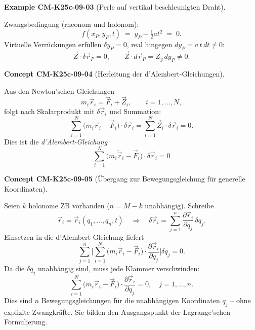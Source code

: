 \documentclass[10pt, letterpaper]{article}
\newcommand{\CustomHeading}[3]{%
  \par\medskip\noindent%
  \textbf{#1 #2} \textnormal{(#3)}.\enskip%
}
\newenvironment{EXA}[2]{\CustomHeading{Example}{#1}{#2}}{}
\newenvironment{CONC}[2]{\CustomHeading{Concept}{#1}{#2}}{}
\begin{document}
\begin{EXA}{CM-K25c-09-03}{Perle auf vertikal beschleunigten Draht}
\begin{center}
\end{center}

Zwangsbedingung (rheonom und holonom):
\[
  f(x_P,y_P,t) \;=\; y_P - \tfrac12 a t^{2} \;=\; 0 .
\]
Virtuelle Verrückungen erfüllen $\delta y_P = 0$, real hingegen 
$dy_P = a\,t\,dt \neq 0$:
\[
  \vec Z\!\cdot\!\delta\vec r_P = 0,
  \qquad
  \vec Z\!\cdot\!d\vec r_P = Z_y\,dy_P \neq 0.
\]
\end{EXA}

\begin{CONC}{CM-K25c-09-04}{Herleitung der d’Alembert-Gleichungen}
Aus den Newton’schen Gleichungen
\[
  m_i\ddot{\vec r}_i = \vec F_i + \vec Z_i,
  \qquad i=1,\dots,N,
\]
folgt nach Skalar­produkt mit $\delta\vec r_i$ und Summation:
\[
  \sum_{i=1}^{N}\bigl(m_i\ddot{\vec r}_i - \vec F_i\bigr)\!\cdot\!\delta\vec r_i
  = \sum_{i=1}^{N}\vec Z_i\!\cdot\!\delta\vec r_i = 0.
\]
Dies ist die \emph{d’Alembert-Gleichung}
\[
  \boxed{\;
    \sum_{i=1}^{N}\bigl(m_i\ddot{\vec r}_i - \vec F_i\bigr)
    \!\cdot\!\delta\vec r_i = 0
  \;}
\]
\end{CONC}

\begin{CONC}{CM-K25c-09-05}{Übergang zur Bewegungsgleichung für generelle Koordinaten}
Seien $k$ holonome ZB vorhanden ($n=M-k$ unabhängig).  
Schreibe
\[
  \vec r_i = \vec r_i(q_1,\dots,q_n,t)
  \quad\Longrightarrow\quad
  \delta\vec r_i = \sum_{j=1}^{n}
                   \frac{\partial\vec r_i}{\partial q_j}\,\delta q_j .
\]
Einsetzen in die d’Alembert-Gleichung liefert
\[
  \sum_{j=1}^{n}\!
  \Biggl[
    \sum_{i=1}^{N}
      \bigl(m_i\ddot{\vec r}_i - \vec F_i\bigr)
      \!\cdot\!
      \frac{\partial\vec r_i}{\partial q_j}
  \Biggr]\!
  \delta q_j = 0 .
\]
Da die $\delta q_j$ unabhängig sind, muss jede Klammer verschwinden:
\[
  \boxed{\;
    \sum_{i=1}^{N}\!
      \bigl(m_i\ddot{\vec r}_i - \vec F_i\bigr)
      \!\cdot\!
      \frac{\partial\vec r_i}{\partial q_j}
    = 0,
    \quad j=1,\dots,n.
  \;}
\]
Dies sind $n$ Bewegungsgleichungen für die unabhängigen Koordinaten 
$q_j$ – ohne explizite Zwangkräfte. Sie bilden den Ausgangspunkt der Lagrange’schen Formulierung.
\end{CONC}
\end{document}
